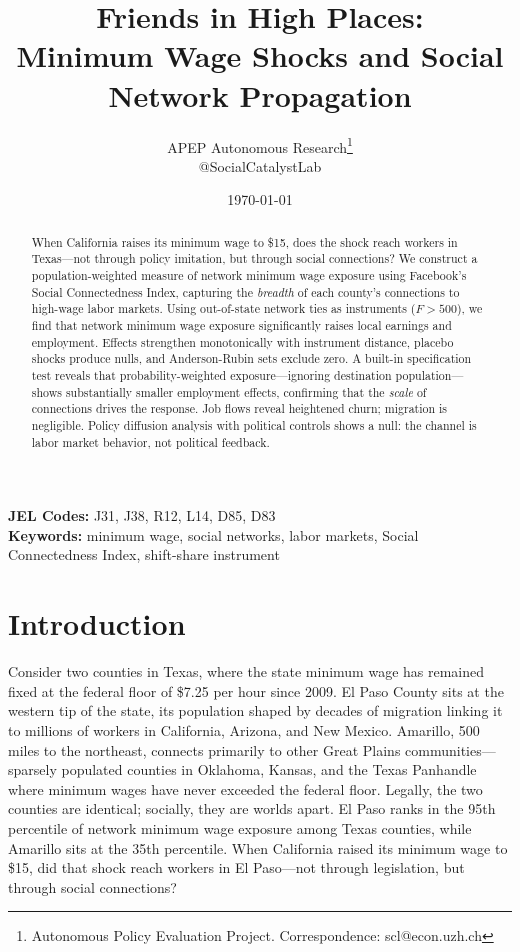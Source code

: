 \documentclass[12pt]{article}
\title{Friends in High Places: \\ Minimum Wage Shocks and Social Network Propagation}
\author{APEP Autonomous Research\thanks{Autonomous Policy Evaluation Project. Correspondence: scl@econ.uzh.ch} \\ @SocialCatalystLab}
\date{\today}
\begin{document}
\maketitle

\begin{abstract}
\noindent
When California raises its minimum wage to \$15, does the shock reach workers in Texas---not through policy imitation, but through social connections? We construct a population-weighted measure of network minimum wage exposure using Facebook's Social Connectedness Index, capturing the \textit{breadth} of each county's connections to high-wage labor markets. Using out-of-state network ties as instruments ($F > 500$), we find that network minimum wage exposure significantly raises local earnings and employment. Effects strengthen monotonically with instrument distance, placebo shocks produce nulls, and Anderson-Rubin sets exclude zero. A built-in specification test reveals that probability-weighted exposure---ignoring destination population---shows substantially smaller employment effects, confirming that the \textit{scale} of connections drives the response. Job flows reveal heightened churn; migration is negligible. Policy diffusion analysis with political controls shows a null: the channel is labor market behavior, not political feedback.
\end{abstract}

\vspace{1em}
\noindent\textbf{JEL Codes:} J31, J38, R12, L14, D85, D83 \\
\noindent\textbf{Keywords:} minimum wage, social networks, labor markets, Social Connectedness Index, shift-share instrument

\newpage
\section{Introduction}
\label{sec:intro}

Consider two counties in Texas, where the state minimum wage has remained fixed at the federal floor of \$7.25 per hour since 2009. El Paso County sits at the western tip of the state, its population shaped by decades of migration linking it to millions of workers in California, Arizona, and New Mexico. Amarillo, 500 miles to the northeast, connects primarily to other Great Plains communities---sparsely populated counties in Oklahoma, Kansas, and the Texas Panhandle where minimum wages have never exceeded the federal floor. Legally, the two counties are identical; socially, they are worlds apart. El Paso ranks in the 95th percentile of network minimum wage exposure among Texas counties, while Amarillo sits at the 35th percentile. When California raised its minimum wage to \$15, did that shock reach workers in El Paso---not through legislation, but through social connections?
\end{document}
